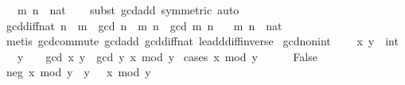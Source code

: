 \begin{isabellebody}
\ \ \ m\ n\ {\isacharcolon}{\kern0pt}{\isacharcolon}{\kern0pt}\ nat\isanewline
%
\isadelimproof
\ \ %
\endisadelimproof
%
\isatagproof
{}\isamarkupfalse%
\ {\isacharparenleft}{\kern0pt}subst\ gcd{\isacharunderscore}{\kern0pt}add{}\ {\isacharbrackleft}{\kern0pt}symmetric{\isacharbrackright}{\kern0pt}{\isacharparenright}{\kern0pt}\ auto%
\endisatagproof
{\isafoldproof}%
%
\isadelimproof
\isanewline
%
\endisadelimproof
\isanewline
{}\isamarkupfalse%
\ gcd{\isacharunderscore}{\kern0pt}diff{}{\isacharunderscore}{\kern0pt}nat{\isacharcolon}{\kern0pt}\ {\isachardoublequoteopen}n\ {\isasymge}\ m\ {\isasymLongrightarrow}\ gcd\ {\isacharparenleft}{\kern0pt}n\ {\isacharminus}{\kern0pt}\ m{\isacharparenright}{\kern0pt}\ n\ {\isacharequal}{\kern0pt}\ gcd\ m\ n{\isachardoublequoteclose}\isanewline
\ \ \ m\ n\ {\isacharcolon}{\kern0pt}{\isacharcolon}{\kern0pt}\ nat\isanewline
%
\isadelimproof
\ \ %
\endisadelimproof
%
\isatagproof
{}\isamarkupfalse%
\ {\isacharparenleft}{\kern0pt}metis\ gcd{\isachardot}{\kern0pt}commute\ gcd{\isacharunderscore}{\kern0pt}add{}\ gcd{\isacharunderscore}{\kern0pt}diff{}{\isacharunderscore}{\kern0pt}nat\ le{\isacharunderscore}{\kern0pt}add{\isacharunderscore}{\kern0pt}diff{\isacharunderscore}{\kern0pt}inverse{}{\isacharparenright}{\kern0pt}%
\endisatagproof
{\isafoldproof}%
%
\isadelimproof
\isanewline
%
\endisadelimproof
\isanewline
{}\isamarkupfalse%
\ gcd{\isacharunderscore}{\kern0pt}non{\isacharunderscore}{\kern0pt}{}{\isacharunderscore}{\kern0pt}int{\isacharcolon}{\kern0pt}\ \isanewline
\ \ \ x\ y\ {\isacharcolon}{\kern0pt}{\isacharcolon}{\kern0pt}\ int\isanewline
\ \ \ {\isachardoublequoteopen}y\ {\isachargreater}{\kern0pt}\ {}{\isachardoublequoteclose}\ \ {\isachardoublequoteopen}gcd\ x\ y\ {\isacharequal}{\kern0pt}\ gcd\ y\ {\isacharparenleft}{\kern0pt}x\ mod\ y{\isacharparenright}{\kern0pt}{\isachardoublequoteclose}\isanewline
%
\isadelimproof
%
\endisadelimproof
%
\isatagproof
{}\isamarkupfalse%
\ {\isacharparenleft}{\kern0pt}cases\ {\isachardoublequoteopen}x\ mod\ y\ {\isacharequal}{\kern0pt}\ {}{\isachardoublequoteclose}{\isacharparenright}{\kern0pt}\isanewline
\ \ \isamarkupfalse%
\ False\isanewline
\ \ \isamarkupfalse%
\ \isamarkupfalse%
\ neg{\isacharcolon}{\kern0pt}\ {\isachardoublequoteopen}x\ mod\ y\ {\isacharequal}{\kern0pt}\ y\ {\isacharminus}{\kern0pt}\ {\isacharparenleft}{\kern0pt}{\isacharminus}{\kern0pt}\ x{\isacharparenright}{\kern0pt}\ mod\ y{\isachardoublequoteclose}\isanewline

\end{isabellebody}
